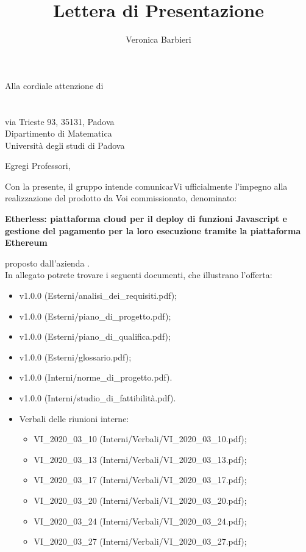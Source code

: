 \documentclass[a4paper]{letter}
\title{Lettera di Presentazione}
\author{Veronica Barbieri}
\begin{document}
\begin{letter} {Alla cordiale attenzione di \\ \TV \\ \RC \\ via Trieste 93, 35131, Padova\\ Dipartimento di Matematica \\ Università degli studi di Padova }
  \vspace*{-0.4\baselineskip}

\opening{Egregi Professori,}
  Con la presente, il gruppo \Gruppo{} intende comunicarVi ufficialmente l'impegno alla realizzazione del prodotto da Voi commissionato, denominato:
  \begin{center}
    \textbf{Etherless: piattaforma cloud per il deploy di funzioni Javascript e gestione del pagamento per la loro esecuzione tramite la piattaforma Ethereum}
  \end{center}
  proposto dall'azienda \Proponente.\\
  In allegato potrete trovare i seguenti documenti, che illustrano l'offerta:
  \begin{itemize}
    \item \AdR{} v1.0.0 (Esterni/analisi\_dei\_requisiti.pdf);
    \item \PdP{} v1.0.0 (Esterni/piano\_di\_progetto.pdf);
    \item \PdQ{} v1.0.0 (Esterni/piano\_di\_qualifica.pdf);
    \item \Glossario{} v1.0.0 (Esterni/glossario.pdf);
    \item \NdP{} v1.0.0 (Interni/norme\_di\_progetto.pdf).
    \item \SdF{} v1.0.0 (Interni/studio\_di\_fattibilità.pdf).
    \item Verbali delle riunioni interne:
      \begin{itemize}
        \item VI\_2020\_03\_10 (Interni/Verbali/VI\_2020\_03\_10.pdf);
        \item VI\_2020\_03\_13 (Interni/Verbali/VI\_2020\_03\_13.pdf);
        \item VI\_2020\_03\_17 (Interni/Verbali/VI\_2020\_03\_17.pdf);
        \item VI\_2020\_03\_20 (Interni/Verbali/VI\_2020\_03\_20.pdf);
        \item VI\_2020\_03\_24 (Interni/Verbali/VI\_2020\_03\_24.pdf);
        \item VI\_2020\_03\_27 (Interni/Verbali/VI\_2020\_03\_27.pdf);

\end{itemize}
\end{itemize}
\end{letter}
\end{document}
